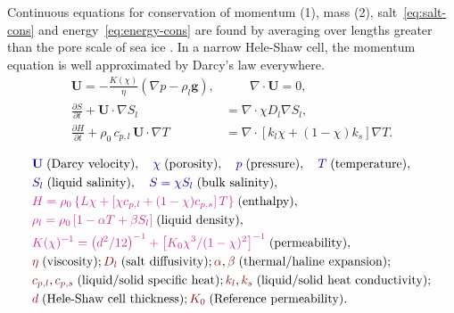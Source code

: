 \documentclass[landscape,24pt, a0paper,colspace=10mm,blockverticalspace=12mm]{tikzposter}
\newcommand{\varColor}[1]{\textcolor{dukeblue}{#1}}
\newcommand{\eqnColor}[1]{\textcolor{royalfuchsia}{#1}}
\newcommand{\paramColor}[1]{\textcolor{falured}{#1}}
\begin{document}
\begin{columns}
\begin{subcolumns}
{\begin{minipage}[t]{0.49\linewidth}
Continuous equations for conservation of momentum (1), mass (2), salt~\eqref{eq:salt-cons} and energy~\eqref{eq:energy-cons} are found by averaging over lengths greater than the pore scale of sea ice \cite{Worster1991,LeBars2006}. In a narrow Hele-Shaw cell, the momentum equation is well approximated by Darcy's law everywhere. 
\begin{align}
     \mathbf{U} = -\frac{K(\chi)}{\eta} \left(\nabla p - \rho_l \mathbf{g} \right), & \quad \quad   \nabla \cdot \mathbf{U} = 0, \tag{1, 2}  \\
    \frac{\partial S}{\partial t} + \mathbf{U} \cdot \nabla S_l &= \nabla \cdot \chi D_l \nabla S_l, \label{eq:salt-cons} \tag{3} \\
    \frac{\partial H}{\partial t} + \rho_0 \, c_{p,l} \, \mathbf{U} \cdot \nabla  T &= \nabla \cdot \left[ k_l \chi + (1-\chi) k_s \right] \nabla T . \label{eq:energy-cons} \tag{4}
\end{align} 
\end{minipage}
\hfill
\begin{minipage}[t][][b]{0.48\linewidth}
\vspace{-1.0\baselineskip}
\begin{align*}
&\varColor{\mathbf{U}}\; \text{(Darcy velocity)}, \quad \varColor{\chi} \; \text{(porosity)}, \quad \varColor{p} \; \text{(pressure)}, \quad \varColor{T} \; \text{(temperature)},\\
&\varColor{S_l} \; \text{(liquid salinity)}, \quad \varColor{S = \chi S_l} \; \text{(bulk salinity)},  \\
&\eqnColor{H = \rho_0 \left\{ L \chi + \left[\chi c_{p,l} + (1-\chi) c_{p,s}\right] T \right\}} \; \text{(enthalpy)}, \\
&\eqnColor{\rho_l = \rho_0 \left[1 - \alpha T + \beta S_l \right]} \; \text{(liquid density)}, \\
&\eqnColor{K(\chi)^{-1} = \left(d^2/12\right)^{-1} + \left[K_0 \chi^3 / (1-\chi)^2 \right]^{-1}} \; \text{(permeability)}, \\
&\paramColor{\eta} \; \text{(viscosity)}; \paramColor{D_l} \; \text{(salt diffusivity)}; \paramColor{\alpha}, \paramColor{\beta} \; \text{(thermal/haline expansion)}; \\
&\paramColor{c_{p,l}}, \paramColor{c_{p,s}} \; \text{(liquid/solid specific heat)}; \paramColor{k_l}, \paramColor{k_s} \; \text{(liquid/solid heat conductivity)}; \\
&\paramColor{d} \; \text{(Hele-Shaw cell thickness)}; \paramColor{K_0} \; \text{(Reference permeability)}.
\end{align*}
\end{minipage}

}
\end{subcolumns}
\end{columns}
\end{document}
